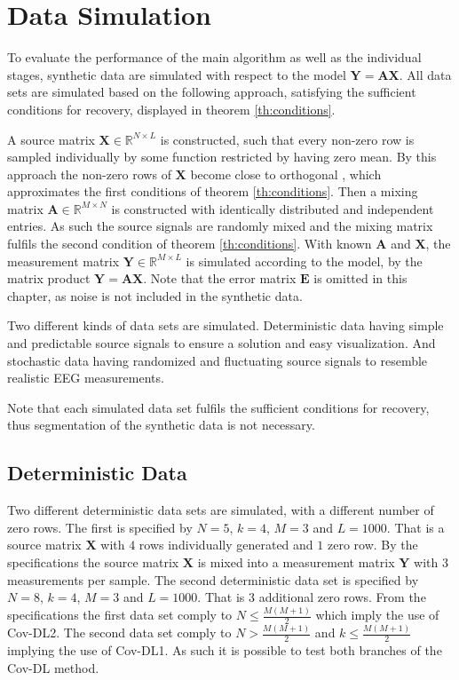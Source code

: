 \section{Data Simulation}\label{sec:dataset}
To evaluate the performance of the main algorithm as well as the individual stages, synthetic data are simulated with respect to the model $\mathbf{Y} = \mathbf{A}\mathbf{X}$. All data sets are simulated based on the following approach, satisfying the sufficient conditions for recovery, displayed in theorem \ref{th:conditions}.
 
A source matrix $\mathbf{X} \in \mathbb{R}^{N \times L}$ is constructed, such that every non-zero row is sampled individually by some function restricted by having zero mean. By this approach the non-zero rows of $\mathbf{X}$ become close to orthogonal \cite{Balkan2014}, which approximates the first conditions of theorem \ref{th:conditions}.   
Then a mixing matrix $\mathbf{A} \in \mathbb{R}^{M \times N}$ is constructed with identically distributed and independent entries. 
As such the source signals are randomly mixed and the mixing matrix fulfils the second condition of theorem \ref{th:conditions}.
With known $\mathbf{A}$ and $\mathbf{X}$, the measurement matrix $\mathbf{Y} \in \mathbb{R}^{M \times L}$ is simulated according to the model, by the matrix product $\mathbf{Y} = \mathbf{AX}$. Note that the error matrix $\mathbf{E}$ is omitted in this chapter, as noise is not included in the synthetic data.  

Two different kinds of data sets are simulated.
Deterministic data having simple and predictable source signals to ensure a solution and easy visualization.
And stochastic data having randomized and fluctuating source signals to resemble realistic EEG measurements.

Note that each simulated data set fulfils the sufficient conditions for recovery, thus segmentation of the synthetic data is not necessary. 

\subsection{Deterministic Data}\label{subseg_simpledata}
Two different deterministic data sets are simulated, with a different number of zero rows. 
The first is specified by $N = 5$, $k = 4$, $M = 3$ and $L = 1000$. 
That is a source matrix $\mathbf{X}$ with $4$ rows individually generated and $1$ zero row. By the specifications the source matrix $\mathbf{X}$ is mixed into a measurement matrix $\mathbf{Y}$ with $3$ measurements per sample.  
The second deterministic data set is specified by $N = 8$, $k = 4$, $M = 3$ and $L = 1000$. 
That is 3 additional zero rows.
From the specifications the first data set comply to $N \leq \frac{M(M+1)}{2}$ which imply the use of Cov-DL2.
The second data set comply to $N > \frac{M(M+1)}{2}$ and $k \leq \frac{M(M+1)}{2}$ implying the use of Cov-DL1. 
As such it is possible to test both branches of the Cov-DL method. 
     
